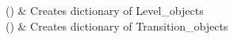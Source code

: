 \documentclass[letterpaper,10pt,english]{sphinxmanual}
\begin{document}
\begin{fulllineitems}
\begin{savenotes}
\begin{longtable}{}
%
{}\\
\hline

\endhead

\hline
{}\\
\endfoot

\endlastfoot

()
&
Creates dictionary of Level\_objects
\\
\hline
{}()
&
Creates dictionary of Transition\_objects
\\
\hline
\end{longtable}\sphinxatlongtableend\end{savenotes}


\begin{savenotes}\sphinxattablestart
\centering
\begin{tabulary}{\linewidth}[t]{|T|T|}
\hline

&\\
\hline
\end{tabulary}
\par
\sphinxattableend\end{savenotes}

\end{fulllineitems}

\label{\detokenize{nice_scheme_plotter:module-nice_scheme_plotter}}
\end{document}
